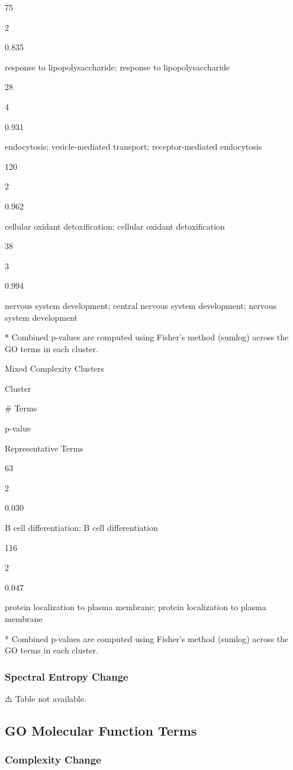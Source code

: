 \documentclass[
  letterpaper,
  DIV=11,
  numbers=noendperiod,
  openany,
  oneside]{scrreprt}
\begin{document}
75

2

0.835

response to lipopolysaccharide; response to lipopolysaccharide

28

4

0.931

endocytosis; vesicle-mediated transport; receptor-mediated endocytosis

120

2

0.962

cellular oxidant detoxification; cellular oxidant detoxification

38

3

0.994

nervous system development; central nervous system development; nervous
system development

* Combined p-values are computed using Fisher's method (sumlog) across
the GO terms in each cluster.

Mixed Complexity Clusters

Cluster

\# Terms

p-value

Representative Terms

63

2

0.030

B cell differentiation; B cell differentiation

116

2

0.047

protein localization to plasma membrane; protein localization to plasma
membrane

* Combined p-values are computed using Fisher's method (sumlog) across
the GO terms in each cluster.

\subsubsection{Spectral Entropy Change}

⚠️ Table not available.

\subsection{GO Molecular Function Terms}

\subsubsection{Complexity Change}
\end{document}
